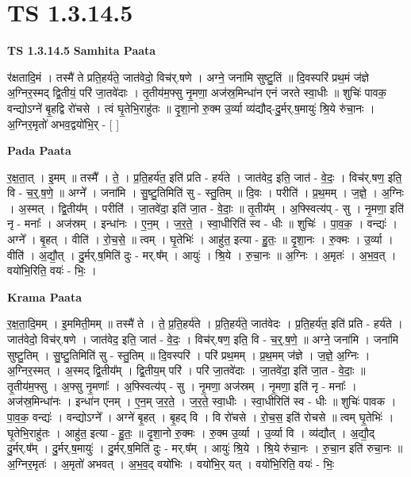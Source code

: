 \documentclass[17pt]{extarticle}
\begin{document}
\section*{ TS 1.3.14.5 }

\textbf{TS 1.3.14.5 } \newline
\textbf{Samhita Paata} \newline

र॑क्षतादि॒मं । तस्मै॑ ते प्रति॒हर्य॑ते॒ जात॑वेदो॒ विच॑र्.षणे । अग्ने॒ जना॑मि सुष्टु॒तिं ॥ दि॒वस्परि॑ प्रथ॒मं ज॑ज्ञे अ॒ग्निर॒स्मद् द्वि॒तीयं॒ परि॑ जा॒तवे॑दाः । तृ॒तीय॑म॒फ्सु नृ॒मणा॒ अज॑स्र॒मिन्धा॑न एनं जरते स्वा॒धीः ॥ शुचिः॑ पावक॒ वन्द्योऽग्ने॑ बृ॒हद्वि रो॑चसे । त्वं घृ॒तेभि॒राहु॑तः ॥ दृ॒शा॒नो रु॒क्म उ॒र्व्या व्य॑द्यौद्-दु॒र्मर्.ष॒मायुः॑ श्रि॒ये रु॑चा॒नः । अ॒ग्निर॒मृतो॑ अभव॒द्वयो॑भि॒र् - [ ] \newline

\textbf{Pada Paata} \newline

र॒क्ष॒ता॒त् । इ॒मम् ॥ तस्मै᳚ । ते॒ । प्र॒ति॒हर्य॑त॒ इति॑ प्रति - हर्य॑ते । जात॑वेद॒ इति॒ जात॑ - वे॒दः॒ । विच॑र्.षण॒ इति॒ वि - च॒र्॒.ष॒णे॒ ॥ अग्ने᳚ । जना॑मि । सु॒ष्टु॒तिमिति॑ सु - स्तु॒तिम् ॥ दि॒वः । परीति॑ । प्र॒थ॒मम् । ज॒ज्ञे॒ । अ॒ग्निः । अ॒स्मत् । द्वि॒तीय᳚म् । परीति॑॑ । जा॒तवे॑दा॒ इति॑ जा॒त - वे॒दाः॒ ॥ तृ॒तीय᳚म् । अ॒फ्स्वित्य॑प् - सु । नृ॒मणा॒ इति॑ नृ - मनाः᳚ । अज॑स्रम् । इन्धा॑नः । ए॒न॒म् । ज॒र॒ते॒ । स्वा॒धीरिति॑ स्व - धीः ॥ शुचिः॑ । पा॒व॒क॒ । वन्द्यः॑ । अग्ने᳚ । बृ॒हत् । वीति॑ । रो॒च॒से॒ ॥ त्वम् । घृ॒तेभिः॑ । आहु॑त॒ इत्या - हु॒तः॒ ॥ दृ॒शा॒नः । रु॒क्मः । उ॒र्व्या । वीति॑ । अ॒द्यौ॒त् । दु॒र्मर्.ष॒मिति॑ दुः - मर्.ष᳚म् । आयुः॑ । श्रि॒ये । रु॒चा॒नः ॥ अ॒ग्निः । अ॒मृतः॑ । अ॒भ॒व॒त् । वयो॑भि॒रिति॒ वयः॑ - भिः॒ ।  \newline


\textbf{Krama Paata} \newline

र॒क्ष॒ता॒दि॒मम् । इ॒ममिती॒मम् ॥ तस्मै॑ ते । ते॒ प्र॒ति॒हर्य॑ते । प्र॒ति॒हर्य॑ते॒ जात॑वेदः । प्र॒ति॒हर्य॑त॒ इति॑ प्रति - हर्य॑ते । जात॑वेदो॒ विच॑र्.षणे । जात॑वेद॒ इति॒ जात॑ - वे॒दः॒ । विच॑र्.षण॒ इति॒ वि - च॒र्॒.ष॒णे॒ ॥ अग्ने॒ जना॑मि । जना॑मि सुष्टु॒तिम् । सु॒ष्टु॒तिमिति॑ सु - स्तु॒तिम् ॥ दि॒वस्परि॑ । परि॑ प्रथ॒मम् । प्र॒थ॒मम् ज॑ज्ञे । ज॒ज्ञे॒ अ॒ग्निः । अ॒ग्निर॒स्मत् । अ॒स्मद् द्वि॒तीय᳚म् । द्वि॒तीय॒म् परि॑ । परि॑ जा॒तवे॑दाः । जा॒तवे॑दा॒ इति॑ जा॒त - वे॒दाः॒ ॥ तृ॒तीय॑म॒फ्सु । अ॒फ्सु नृ॒मणाः᳚ । अ॒फ्स्वित्य॑प् - सु । नृ॒मणा॒ अज॑स्रम् । नृ॒मणा॒ इति॑ नृ - मनाः᳚ । अज॑स्र॒मिन्धा॑नः । इन्धा॑न एनम् । ए॒न॒म् ज॒र॒ते॒ । ज॒र॒ते॒ स्वा॒धीः । स्वा॒धीरिति॑ स्व - धीः ॥ शुचिः॑ पावक । पा॒व॒क॒ वन्द्यः॑ । वन्द्योऽग्ने᳚ । अग्ने॑ बृ॒हत् । बृ॒हद् वि । वि रो॑चसे । रो॒च॒स॒ इति॑ रोचसे ॥ त्वम् घृ॒तेभिः॑ । घृ॒तेभि॒राहु॑तः । आहु॑त॒ इत्या - हु॒तः॒ ॥ दृ॒शा॒नो रु॒क्मः । रु॒क्म उ॒र्व्या । उ॒र्व्या वि । व्य॑द्यौत् । अ॒द्यौ॒द् दु॒र्मर्.ष᳚म् । दु॒र्मर्.ष॒मायुः॑ । दु॒र्मर्.ष॒मिति॑ दुः - मर्.ष᳚म् । आयुः॑ श्रि॒ये । श्रि॒ये रु॑चा॒नः । रु॒चा॒न इति॑ रुचा॒नः ॥ 
अ॒ग्निर॒मृतः॑ । अ॒मृतो॑ अभवत् । अ॒भ॒व॒द् वयो॑भिः । वयो॑भि॒र् यत् । वयो॑भि॒रिति॒ वयः॑ - भिः॒ \newline
\end{document}
